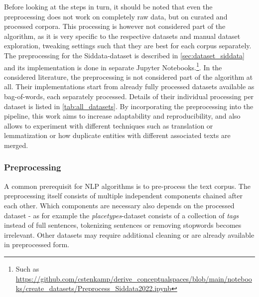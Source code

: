 Before looking at the steps in turn, it should be noted that even the preprocessing does not work on completely raw data, but on curated and processed corpora. This processing is however not considered part of the algorithm, as it is very specific to the respective datasets and manual dataset exploration, tweaking settings such that they are best for each corpus separately. The preprocessing for the Siddata-dataset is described in \autoref{sec:dataset_siddata} and its implementation is done in separate Jupyter Notebooks.\footnote{Such as \url{https://github.com/cstenkamp/derive_conceptualspaces/blob/main/notebooks/create_datasets/Preprocess_Siddata2022.ipynb}}. In the considered literature, the preprocessing is not considered part of the algorithm at all. Their implementations start from already fully processed datasets available as bag-of-words, each separately processed. Details of their individual processing per dataset is listed in \autoref{tab:all_datasets}. By incorporating the preprocessing into the pipeline, this work aims to increase adaptability and reproducibility, and also allows to experiment with different techniques such as translation or lemmatization or how duplicate entities with different associated texts are merged.

\subsubsection{Preprocessing}

\label{sec:algo_preproc}

A common prerequisit for NLP algorithms is to pre-process the text corpus. The preprocessing itself consists of multiple independent components chained after each other. Which components are necessary also depends on the processed dataset - as for example the \emph{placetypes}-dataset consists of a collection of \textit{tags} instead of full sentences, tokenizing sentences or removing \glspl{stopword} becomes irrelevant. Other datasets may require additional cleaning or are already available in preprocessed form.

